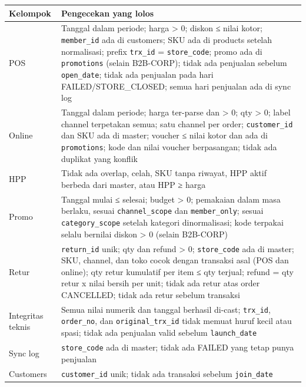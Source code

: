 \documentclass[10pt,a4paper]{article}
\begin{document}
{\def\LTcaptype{none} %
\begin{longtable}[]{@{}
  >{\raggedright\arraybackslash}p{}
  >{\raggedright\arraybackslash}p{}@{}}
\toprule\noalign{}
\begin{minipage}[b]{\linewidth}\raggedright
Kelompok
\end{minipage} & \begin{minipage}[b]{\linewidth}\raggedright
Pengecekan yang lolos
\end{minipage} \\
\midrule\noalign{}
\endhead
\bottomrule\noalign{}
\endlastfoot
POS & Tanggal dalam periode; harga \textgreater{} 0; diskon ≤ nilai kotor; \texttt{member\_\allowbreak{}id} ada di customers; SKU ada di products setelah normalisasi; prefix \texttt{trx\_\allowbreak{}id} = \texttt{store\_\allowbreak{}code}; promo ada di \texttt{promotions} (selain B2B-CORP); tidak ada penjualan sebelum \texttt{open\_\allowbreak{}date}; tidak ada penjualan pada hari FAILED/STORE\_\allowbreak{}CLOSED; semua hari penjualan ada di sync log \\
Online & Tanggal dalam periode; harga ter-parse dan \textgreater{} 0; qty \textgreater{} 0; label channel terpetakan semua; satu channel per order; \texttt{customer\_\allowbreak{}id} dan SKU ada di master; voucher ≤ nilai kotor dan ada di \texttt{promotions}; kode dan nilai voucher berpasangan; tidak ada duplikat yang konflik \\
HPP & Tidak ada overlap, celah, SKU tanpa riwayat, HPP aktif berbeda dari master, atau HPP ≥ harga \\
Promo & Tanggal mulai ≤ selesai; budget \textgreater{} 0; pemakaian dalam masa berlaku, sesuai \texttt{channel\_\allowbreak{}scope} dan \texttt{member\_\allowbreak{}only}; sesuai \texttt{category\_\allowbreak{}scope} setelah kategori dinormalisasi; kode terpakai selalu bernilai diskon \textgreater{} 0 (selain B2B-CORP) \\
Retur & \texttt{return\_\allowbreak{}id} unik; qty dan refund \textgreater{} 0; \texttt{store\_\allowbreak{}code} ada di master; SKU, channel, dan toko cocok dengan transaksi asal (POS dan online); qty retur kumulatif per item ≤ qty terjual; refund = qty retur x nilai bersih per unit; tidak ada retur atas order CANCELLED; tidak ada retur sebelum transaksi \\
Integritas teknis & Semua nilai numerik dan tanggal berhasil di-cast; \texttt{trx\_\allowbreak{}id}, \texttt{order\_\allowbreak{}no}, dan \texttt{original\_\allowbreak{}trx\_\allowbreak{}id} tidak memuat huruf kecil atau spasi; tidak ada penjualan valid sebelum \texttt{launch\_\allowbreak{}date} \\
Sync log & \texttt{store\_\allowbreak{}code} ada di master; tidak ada FAILED yang tetap punya penjualan \\
Customers & \texttt{customer\_\allowbreak{}id} unik; tidak ada transaksi sebelum \texttt{join\_\allowbreak{}date} \\
\end{longtable}
}
\end{document}
